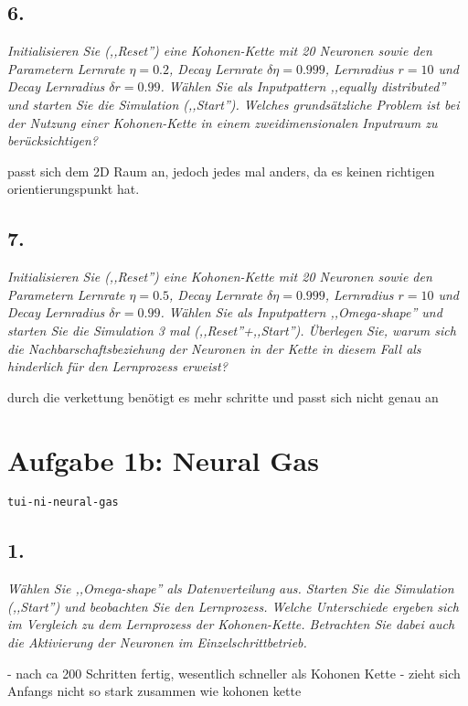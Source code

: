 \documentclass[a4paper,10pt,titlepage]{scrartcl}
\begin{document}
\subsection*{6.}
\textit{Initialisieren Sie (,,Reset'') eine Kohonen-Kette mit 20 Neuronen sowie den Parametern Lernrate $\eta=0.2$, Decay Lernrate $\delta\eta=0.999$, Lernradius $r=10$ und Decay Lernradius $\delta r=0.99$. Wählen Sie als Inputpattern ,,equally distributed'' und starten Sie die Simulation (,,Start''). Welches grundsätzliche Problem ist bei der Nutzung einer Kohonen-Kette in einem zweidimensionalen Inputraum zu berücksichtigen?}

passt sich dem 2D Raum an, jedoch jedes mal anders, da es keinen richtigen orientierungspunkt hat.

\subsection*{7.}
\textit{Initialisieren Sie (,,Reset'') eine Kohonen-Kette mit 20 Neuronen sowie den Parametern Lernrate $\eta=0.5$, Decay Lernrate $\delta\eta=0.999$, Lernradius $r=10$ und Decay Lernradius $\delta r=0.99$. Wählen Sie als Inputpattern ,,Omega-shape'' und starten Sie die Simulation 3 mal (,,Reset''+,,Start''). Überlegen Sie, warum sich die Nachbarschaftsbeziehung der Neuronen in der Kette in diesem Fall als hinderlich für den Lernprozess erweist?}

durch die verkettung benötigt es mehr schritte und passt sich nicht genau an

\section*{Aufgabe 1b: Neural Gas}
\lstinline{tui-ni-neural-gas}
\subsection*{1.}
\textit{Wählen Sie ,,Omega-shape'' als Datenverteilung aus. Starten Sie die Simulation (,,Start'') und beobachten Sie den Lernprozess. Welche Unterschiede ergeben sich im Vergleich zu dem Lernprozess der Kohonen-Kette. Betrachten Sie dabei auch die Aktivierung der Neuronen im Einzelschrittbetrieb.}

- nach ca 200 Schritten fertig, wesentlich schneller als Kohonen Kette
- zieht sich Anfangs nicht so stark zusammen wie kohonen kette
\end{document}

